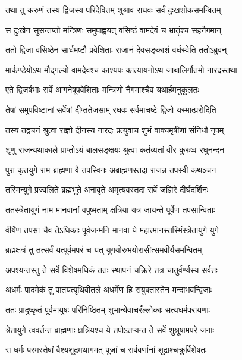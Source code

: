 \twolineshloka
{तथा तु करुणं तस्य द्विजस्य परिदेवितम्}
{शुश्राव राघवः सर्वं दुःखशोकसमन्वितम्} %

\twolineshloka
{स दुःखेन सुसन्तप्तो मन्त्रिणः समुपाह्वयत्}
{वसिष्ठं वामदेवं च भ्रातॄंश्च सहनैगमान्} %

\twolineshloka
{ततो द्विजा वसिष्ठेन सार्धमष्टौ प्रवेशिताः}
{राजानं देवसङ्काशं वर्धस्वेति ततोऽब्रुवन्} %

\twolineshloka
{मार्कण्डेयोऽथ मौद्गल्यो वामदेवश्च काश्यपः}
{कात्यायनोऽथ जाबालिर्गौतमो नारदस्तथा} %

\twolineshloka
{एते द्विजर्षभाः सर्वे आगनेषूपवेशिताः}
{मन्त्रिणो नैगमाश्चैव यथार्हमनुकूलतः} %

\twolineshloka
{तेषां समुपविष्टानां सर्वेषां दीप्ततेजसाम्}
{रघवः सर्वमाचष्टे द्विजो यस्मात्प्ररोदिति} %

\twolineshloka
{तस्य तद्वचनं श्रुत्वा राज्ञो दीनस्य नारदः}
{प्रत्युवाच शुभं वाक्यमृषीणां संनिधौ नृपम्} %

\twolineshloka
{शृणु राजन्यथाकाले प्राप्तोऽयं बालसङ्क्षयः}
{श्रुत्वा कर्तव्यतां वीर कुरुष्व रघुनन्दन} %

\twolineshloka
{पुरा कृतयुगे राम ब्राह्मणा वै तपस्विनः}
{अब्राह्मणस्तदा राजन्न तपस्वी कथञ्चन} %

\twolineshloka
{तस्मिन्युगे प्रज्वलिते ब्रह्मभूते अनावृते}
{अमृत्यवस्तदा सर्वे जज्ञिरे दीर्घदर्शिनः} %

\twolineshloka
{ततस्त्रेतायुगं नाम मानवानां वपुष्मताम्}
{क्षत्रिया यत्र जायन्ते पूर्वेण तपसान्विताः} %

\twolineshloka
{वीर्येण तपसा चैव तेऽधिकाः पूर्वजन्मनि}
{मानवा ये महात्मानस्तस्मिंस्त्रेतायुगे युगे} %

\twolineshloka
{ब्रह्मक्षत्रं तु तत्सर्वं यत्पूर्वमपरं च यत्}
{युगयोरुभयोरासीत्समवीर्यसमन्वितम्} %

\twolineshloka
{अपश्यन्तस्तु ते सर्वे विशेषमधिकं ततः}
{स्थापनं चक्रिरे तत्र चातुर्वर्ण्यस्य सर्वतः} %

\twolineshloka
{अधर्मः पादमेकं तु पातयत्पृथिवीतले}
{अधर्मेण हि संयुक्तास्तेन मन्दाभवन्द्विजाः} %

\twolineshloka
{ततः प्रादुष्कृतं पूर्वमायुषः परिनिष्ठितम्}
{शुभान्येवाचरँल्लोकाः सत्यधर्मपरायणाः} %

\twolineshloka
{त्रेतायुगे त्ववर्तन्त ब्राह्मणाः क्षत्रियश्च ये}
{तपोऽतप्यन्त ते सर्वे शुश्रूषामपरे जनाः} %

\twolineshloka
{स धर्मः परमस्तेषां वैश्यशूद्रमथागमत्}
{पूजां च सर्ववर्णानां शूद्राश्चक्रुर्विशेषतः} %

